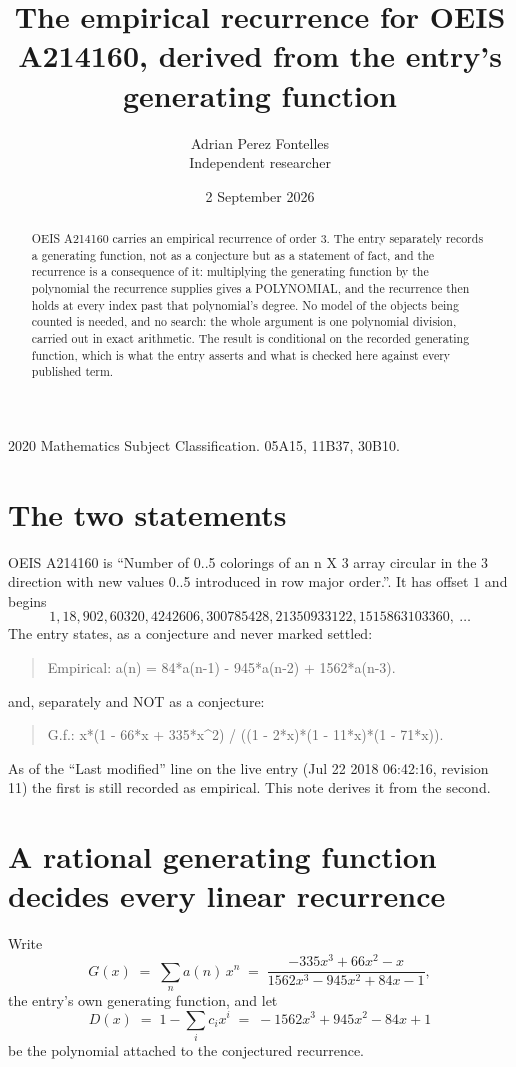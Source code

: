 \documentclass[11pt,a4paper]{article}
\title{The empirical recurrence for OEIS A214160, derived from the entry's generating function}
\author{Adrian Perez Fontelles\\ \small Independent researcher}
\date{2 September 2026}
\theoremstyle{plain}
\theoremstyle{definition}
\begin{document}
\maketitle

\begin{abstract}
OEIS A214160 carries an empirical recurrence of order $3$. The entry separately records a
generating function, not as a conjecture but as a statement of fact, and the recurrence is a
consequence of it: multiplying the generating function by the polynomial the recurrence
supplies gives a POLYNOMIAL, and the recurrence then holds at every index past that
polynomial's degree. No model of the objects being counted is needed, and no search: the
whole argument is one polynomial division, carried out in exact arithmetic. The result is
conditional on the recorded generating function, which is what the entry asserts and what is
checked here against every published term.
\end{abstract}

\noindent\small 2020 Mathematics Subject Classification. 05A15, 11B37, 30B10.\normalsize

\section{The two statements}

OEIS A214160 is ``Number of 0..5 colorings of an n X 3 array circular in the 3 direction with new values 0..5 introduced in row major order.''. It has offset $1$ and begins
\[
1, 18, 902, 60320, 4242606, 300785428, 21350933122, 1515863103360,\ \dots
\]
The entry states, as a conjecture and never marked settled:
\begin{quote}
Empirical: a(n) = 84*a(n-1) - 945*a(n-2) + 1562*a(n-3).
\end{quote}
and, separately and NOT as a conjecture:
\begin{quote}
G.f.: x*(1 - 66*x + 335*x\^{}2) / ((1 - 2*x)*(1 - 11*x)*(1 - 71*x)).
\end{quote}
As of the ``Last modified'' line on the live entry (Jul 22 2018 06:42:16, revision 11) the first is still
recorded as empirical. This note derives it from the second.

\section{A rational generating function decides every linear recurrence}

Write
\[
G(x)\;=\;\sum_{n}a(n)\,x^{n}\;=\;\frac{- 335 x^{3} + 66 x^{2} - x}{1562 x^{3} - 945 x^{2} + 84 x - 1},
\]
the entry's own generating function, and let
\[
D(x)\;=\;1-\sum_i c_i x^{i}\;=\;- 1562 x^{3} + 945 x^{2} - 84 x + 1
\]
be the polynomial attached to the conjectured recurrence.
\end{document}

